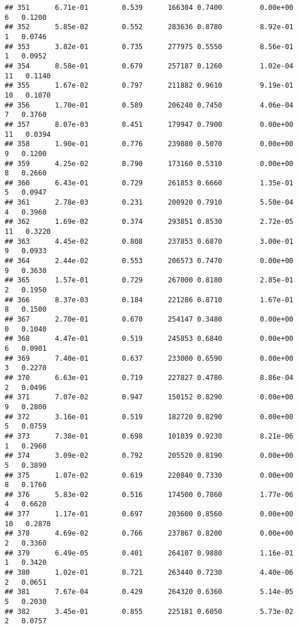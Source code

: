 \documentclass[
]{article}
\begin{document}
\begin{verbatim}
## 351      6.71e-01        0.539      166304 0.7400         0.00e+00   6   0.1200
## 352      5.85e-02        0.552      283636 0.8780         8.92e-01   1   0.0746
## 353      3.82e-01        0.735      277975 0.5550         8.56e-01   1   0.0952
## 354      8.58e-01        0.679      257187 0.1260         1.02e-04  11   0.1140
## 355      1.67e-02        0.797      211882 0.9610         9.19e-01  10   0.1070
## 356      1.70e-01        0.589      206240 0.7450         4.06e-04   7   0.3760
## 357      8.07e-03        0.451      179947 0.7900         0.00e+00  11   0.0394
## 358      1.90e-01        0.776      239880 0.5070         0.00e+00   9   0.1200
## 359      4.25e-02        0.790      173160 0.5310         0.00e+00   8   0.2660
## 360      6.43e-01        0.729      261853 0.6660         1.35e-01   5   0.0947
## 361      2.78e-03        0.231      200920 0.7910         5.50e-04   4   0.3960
## 362      1.69e-02        0.374      293851 0.8530         2.72e-05  11   0.3220
## 363      4.45e-02        0.808      237853 0.6870         3.00e-01   9   0.0933
## 364      2.44e-02        0.553      206573 0.7470         0.00e+00   9   0.3630
## 365      1.57e-01        0.729      267000 0.8180         2.85e-01   2   0.1950
## 366      8.37e-03        0.184      221286 0.8710         1.67e-01   8   0.1500
## 367      2.70e-01        0.670      254147 0.3480         0.00e+00   0   0.1040
## 368      4.47e-01        0.519      245853 0.6840         0.00e+00   6   0.0901
## 369      7.40e-01        0.637      233000 0.6590         0.00e+00   3   0.2270
## 370      6.63e-01        0.719      227827 0.4780         8.86e-04   2   0.0496
## 371      7.07e-02        0.947      150152 0.8290         0.00e+00   9   0.2800
## 372      3.16e-01        0.519      182720 0.8290         0.00e+00   5   0.0759
## 373      7.38e-01        0.698      101039 0.9230         8.21e-06   1   0.2960
## 374      3.09e-02        0.792      205520 0.8190         0.00e+00   5   0.3890
## 375      1.07e-02        0.619      220840 0.7330         0.00e+00   8   0.1760
## 376      5.83e-02        0.516      174500 0.7860         1.77e-06   4   0.6620
## 377      1.17e-01        0.697      203600 0.8560         0.00e+00  10   0.2870
## 378      4.69e-02        0.766      237867 0.8200         0.00e+00   2   0.3360
## 379      6.49e-05        0.401      264107 0.9880         1.16e-01   1   0.3420
## 380      1.02e-01        0.721      263440 0.7230         4.40e-06   2   0.0651
## 381      7.67e-04        0.429      264320 0.6360         5.14e-05   5   0.2030
## 382      3.45e-01        0.855      225181 0.6050         5.73e-02   2   0.0757

\end{verbatim}
\end{document}
